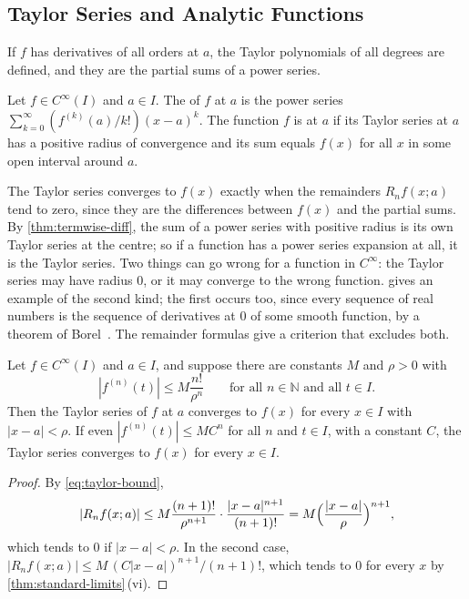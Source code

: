 \subsection{Taylor Series and Analytic Functions}

If $f$ has derivatives of all orders at $a$, the Taylor polynomials of all degrees are defined, and they are the partial sums of a power series.

\begin{definition}
\label{def:taylor-series}
Let $f\in C^\infty(I)$ and $a\in I$. The  of $f$ at $a$ is the power series $\sum_{k=0}^\infty(f^{(k)}(a)/k!)(x-a)^k$. The function $f$ is  at $a$ if its Taylor series at $a$ has a positive radius of convergence and its sum equals $f(x)$ for all $x$ in some open interval around $a$.
\end{definition}

The Taylor series converges to $f(x)$ exactly when the remainders $R_nf(x;a)$ tend to zero, since they are the differences between $f(x)$ and the partial sums. By \cref{thm:termwise-diff}, the sum of a power series with positive radius is its own Taylor series at the centre; so if a function has a power series expansion at all, it is the Taylor series. Two things can go wrong for a function in $C^\infty$: the Taylor series may have radius $0$, or it may converge to the wrong function.  gives an example of the second kind; the first occurs too, since every sequence of real numbers is the sequence of derivatives at $0$ of some smooth function, by a theorem of Borel~\cite{borel1895}. The remainder formulas give a criterion that excludes both.

\begin{theorem}
\label{thm:taylor-convergence}
Let $f\in C^\infty(I)$ and $a\in I$, and suppose there are constants $M$ and $\rho>0$ with
\[
|f^{(n)}(t)|\le M\frac{n!}{\rho^n}\qquad\text{for all }n\in\mathbb N\text{ and all }t\in I.
\]
Then the Taylor series of $f$ at $a$ converges to $f(x)$ for every $x\in I$ with $|x-a|<\rho$. If even $|f^{(n)}(t)|\le MC^n$ for all $n$ and $t\in I$, with a constant $C$, the Taylor series converges to $f(x)$ for every $x\in I$.
\end{theorem}

\begin{proof}
By \eqref{eq:taylor-bound},
\[
|R_nf(x;a)|\le M\frac{(n+1)!}{\rho^{n+1}}\cdot\frac{|x-a|^{n+1}}{(n+1)!}=M\Bigl(\frac{|x-a|}\rho\Bigr)^{n+1},
\]
which tends to $0$ if $|x-a|<\rho$. In the second case, $|R_nf(x;a)|\le M\,(C|x-a|)^{n+1}/(n+1)!$, which tends to $0$ for every $x$ by \cref{thm:standard-limits}\,(vi).
\end{proof}

